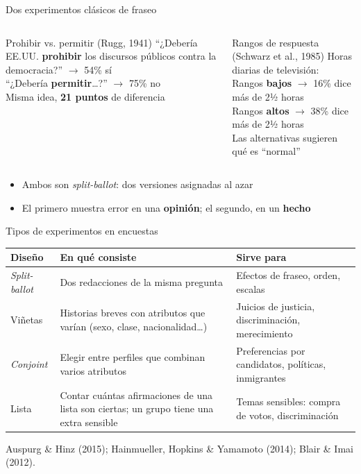 \documentclass[aspectratio=169,11pt]{beamer}
\newcommand{\hl}[1]{\textcolor{marino}{\textbf{#1}}}        %
\newcommand{\fuente}[1]{\par\vfill{\scriptsize\color{gris}#1\par}}
\begin{document}
\begin{frame}{Dos experimentos clásicos de fraseo}
\begin{columns}[T]
\begin{exampleblock}{Prohibir vs. permitir (Rugg, 1941)}
\small
``¿Debería EE.UU. \textbf{prohibir} los discursos públicos contra la democracia?'' $\rightarrow$ 54\% sí\\[4pt]
``¿Debería \textbf{permitir}\ldots?'' $\rightarrow$ 75\% no\\[4pt]
Misma idea, \textbf{21 puntos} de diferencia
\end{exampleblock}
\begin{exampleblock}{Rangos de respuesta (Schwarz et al., 1985)}
\small
Horas diarias de televisión:\\[4pt]
Rangos \textbf{bajos} $\rightarrow$ 16\% dice más de 2½ horas\\
Rangos \textbf{altos} $\rightarrow$ 38\% dice más de 2½ horas\\[4pt]
Las alternativas sugieren qué es ``normal''
\end{exampleblock}
\end{columns}
\bigskip
\begin{itemize}
  \item Ambos son \textit{split-ballot}: dos versiones asignadas al azar
  \item El primero muestra error en una \textbf{opinión}; el segundo, en un \hl{hecho}
\end{itemize}
\end{frame}

\begin{frame}{Tipos de experimentos en encuestas}
\begin{center}
\small
\begin{tabular}{>{\raggedright}p{}>{\raggedright}p{}p{}}
\toprule
\textbf{Diseño} & \textbf{En qué consiste} & \textbf{Sirve para} \\
\midrule
\rowcolor{crema}
\textit{Split-ballot} & Dos redacciones de la misma pregunta & Efectos de fraseo, orden, escalas \\
Viñetas & Historias breves con atributos que varían (sexo, clase, nacionalidad\ldots) & Juicios de justicia, discriminación, merecimiento \\
\rowcolor{crema}
\textit{Conjoint} & Elegir entre perfiles que combinan varios atributos & Preferencias por candidatos, políticas, inmigrantes \\
Lista & Contar cuántas afirmaciones de una lista son ciertas; un grupo tiene una extra sensible & Temas sensibles: compra de votos, discriminación \\
\bottomrule
\end{tabular}
\end{center}
\fuente{Auspurg \& Hinz (2015); Hainmueller, Hopkins \& Yamamoto (2014); Blair \& Imai (2012).}
\end{frame}
\end{document}
